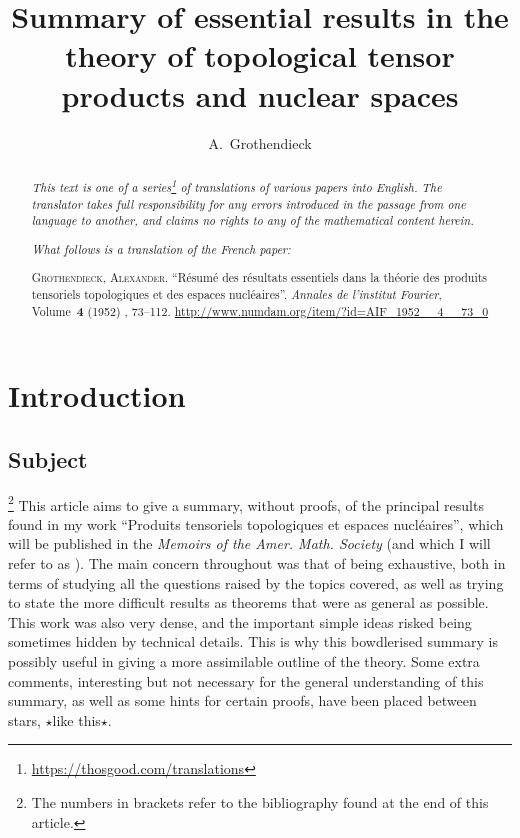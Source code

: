 \documentclass{article}
\title{Summary of essential results in the theory of topological tensor products and nuclear spaces}
\author{A.~Grothendieck}
\date{}
\newcommand{\doctype}{French paper}
\newcommand{\origcit}{%
  \textsc{Grothendieck, Alexander}.
  ``R\'{e}sum\'{e} des r\'{e}sultats essentiels dans la th\'{e}orie des produits tensoriels topologiques et des espaces nucl\'{e}aires''.
  \emph{Annales de l'institut Fourier}, Volume~\textbf{4} (1952) , 73--112.
  {\url{http://www.numdam.org/item/?id=AIF_1952__4__73_0}}%
}
\theoremstyle{plain}
\newcommand{\aster}[1]{$\star${#1}$\star$}
\newcommand{\oldpage}[1]{\marginpar{\footnotesize$\Big\vert$ \textit{p.~#1}}}
\begin{document}
\maketitle
\thispagestyle{fancy}

\renewcommand{\abstractname}{Translator's note.}

\begin{abstract}
  \renewcommand*{\thefootnote}{\fnsymbol{footnote}}
  \emph{This text is one of a series\footnote{\url{https://thosgood.com/translations}} of translations of various papers into English.}
  \emph{The translator takes full responsibility for any errors introduced in the passage from one language to another, and claims no rights to any of the mathematical content herein.}

  \medskip
  
  \emph{What follows is a translation of the \doctype:}

  \medskip\noindent
  \origcit
\end{abstract}

\setcounter{footnote}{0}

\tableofcontents
\bigskip



\section*{Introduction}
%


\subsection*{Subject}
%

\oldpage{73}

\footnote{The numbers in brackets refer to the bibliography found at the end of this article.}
This article aims to give a summary, without proofs, of the principal results found in my work ``Produits tensoriels topologiques et espaces nucl\'{e}aires'', which will be published in the \emph{Memoirs of the Amer. Math. Society} (and which I will refer to as \cite{PTT}).
The main concern throughout \cite{PTT} was that of being exhaustive, both in terms of studying all the questions raised by the topics covered, as well as trying to state the more difficult results as theorems that were as general as possible.
This work was also very dense, and the important simple ideas risked being sometimes hidden by technical details.
This is why this bowdlerised summary is possibly useful in giving a more assimilable outline of the theory.
Some extra comments, interesting but not necessary for the general understanding of this summary, as well as some hints for certain proofs, have been placed between stars, \aster{like this}.
\end{document}
